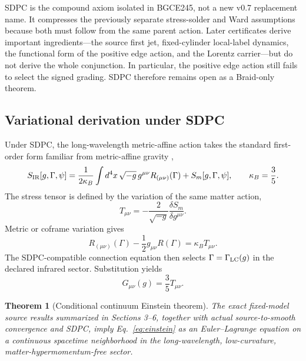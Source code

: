 \documentclass[11pt]{article}
\newtheorem{theorem}{Theorem}[section]
\theoremstyle{definition}
\theoremstyle{remark}
\begin{document}
SDPC is the compound axiom isolated in BGCE245, not a new v0.7 replacement name. It compresses the previously separate stress-solder and Ward assumptions because both must follow from the same parent action. Later certificates derive important ingredients---the source first jet, fixed-cylinder local-label dynamics, the functional form of the positive edge action, and the Lorentz carrier---but do not derive the whole conjunction. In particular, the positive edge action still fails to select the signed grading. SDPC therefore remains open as a Braid-only theorem.

\subsection{Variational derivation under SDPC}

Under SDPC, the long-wavelength metric-affine action takes the standard first-order form familiar from metric-affine gravity \cite{hehl1995},
\begin{equation}\label{eq:sir}
 S_{\rm IR}[g,\Gamma,\psi]
 =\frac{1}{2\kappa_B}\int d^4x\,\sqrt{-g}\,
 g^{\mu\nu}R_{(\mu\nu)}(\Gamma)
 +S_m[g,\Gamma,\psi],
 \qquad \kappa_B=\frac35.
\end{equation}
The stress tensor is defined by the variation of the same matter action,
\begin{equation}\label{eq:stress}
 T_{\mu\nu}=-\frac{2}{\sqrt{-g}}
 \frac{\delta S_m}{\delta g^{\mu\nu}}.
\end{equation}
Metric or coframe variation gives
\begin{equation}
 R_{(\mu\nu)}(\Gamma)-\frac12g_{\mu\nu}R(\Gamma)
 =\kappa_BT_{\mu\nu}.
\end{equation}
The SDPC-compatible connection equation then selects $\Gamma=\Gamma_{\rm LC}(g)$ in the declared infrared sector. Substitution yields
\begin{equation}\label{eq:einstein}
 \boxed{G_{\mu\nu}(g)=\frac35T_{\mu\nu}}.
\end{equation}

\begin{theorem}[Conditional continuum Einstein theorem]\label{thm:einstein}
The exact fixed-model source results summarized in Sections 3--6, together with actual source-to-smooth convergence and SDPC, imply Eq.~\eqref{eq:einstein} as an Euler--Lagrange equation on a continuous spacetime neighborhood in the long-wavelength, low-curvature, matter-hypermomentum-free sector.
\end{theorem}
\end{document}
